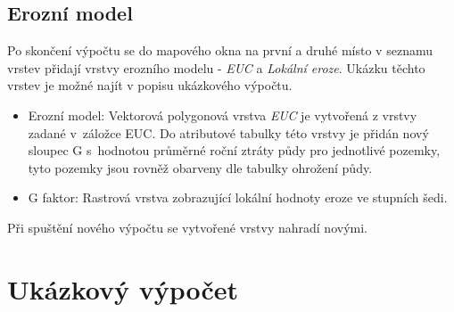 \subsection{Erozní model} Po skončení výpočtu se do mapového okna na
první a druhé místo v seznamu vrstev přidají vrstvy erozního modelu -
\textit{EUC} a \textit{Lokální eroze}. Ukázku těchto vrstev je možné
najít v popisu ukázkového výpočtu.
\begin{itemize}
	\item Erozní model: Vektorová polygonová vrstva \textit{EUC}
je vytvořená z vrstvy zadané v~záložce EUC. Do atributové tabulky této
vrstvy je přidán nový sloupec G s~hodnotou průměrné roční ztráty půdy
pro jednotlivé pozemky, tyto pozemky jsou rovněž obarveny dle tabulky
ohrožení půdy.
	\item G faktor: Rastrová vrstva zobrazující lokální hodnoty
eroze ve stupních šedi.
\end{itemize} Při spuštění nového výpočtu se vytvořené vrstvy nahradí
novými.

\section{Ukázkový výpočet}

